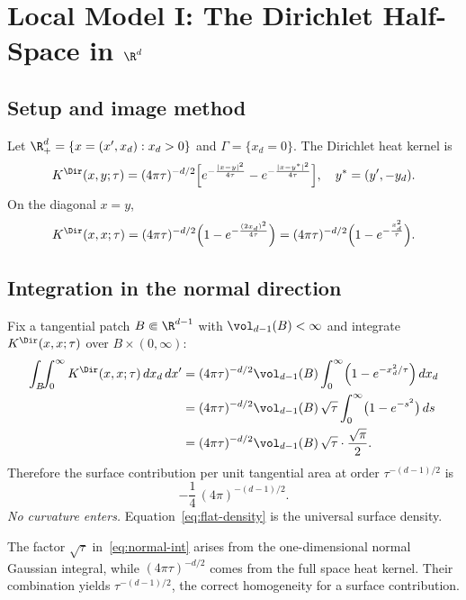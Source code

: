 \section{Local Model I: The Dirichlet Half-Space in $\R^d$}
\label{sec:model-halfspace}

\subsection{Setup and image method}
Let $\R^d_+=\{x=(x',x_d): x_d>0\}$ and $\Gamma=\{x_d=0\}$.
The Dirichlet heat kernel is
\begin{equation}\label{eq:dir-halfspace-kernel}
K^\Dir(x,y;\tau)=(4\pi\tau)^{-d/2}\Big[e^{-\frac{|x-y|^2}{4\tau}}-e^{-\frac{|x-y^\ast|^2}{4\tau}}\Big],
\quad y^\ast=(y',-y_d).
\end{equation}
On the diagonal $x=y$,
\begin{equation}\label{eq:diagonal-half}
K^\Dir(x,x;\tau)=(4\pi\tau)^{-d/2}\Big(1-e^{-\frac{(2x_d)^2}{4\tau}}\Big)=(4\pi\tau)^{-d/2}\Big(1-e^{-\frac{x_d^2}{\tau}}\Big).
\end{equation}

\subsection{Integration in the normal direction}
Fix a tangential patch $B\Subset\R^{d-1}$ with $\vol_{d-1}(B)<\infty$ and integrate $K^\Dir(x,x;\tau)$ over $B\times(0,\infty)$:
\begin{align}
\int_{B}\!\!\int_{0}^{\infty} K^\Dir(x,x;\tau)\,dx_d\,dx'
&=(4\pi\tau)^{-d/2}\vol_{d-1}(B)\int_0^\infty\!\Big(1-e^{-x_d^2/\tau}\Big)\,dx_d \nonumber\\
&=(4\pi\tau)^{-d/2}\vol_{d-1}(B)\,\sqrt{\tau}\int_0^\infty\!\big(1-e^{-s^2}\big)\,ds \nonumber\\
&=(4\pi\tau)^{-d/2}\vol_{d-1}(B)\,\sqrt{\tau}\cdot\frac{\sqrt{\pi}}{2}. \label{eq:normal-int}
\end{align}
Therefore the surface contribution per unit tangential area at order $\tau^{-(d-1)/2}$ is
\begin{equation}\label{eq:flat-density}
-\frac{1}{4}\,(4\pi)^{-(d-1)/2}.
\end{equation}
\emph{No curvature enters.} Equation~\eqref{eq:flat-density} is the universal surface density.

\begin{remark}
The factor $\sqrt{\tau}$ in~\eqref{eq:normal-int} arises from the one-dimensional normal Gaussian integral, while $(4\pi\tau)^{-d/2}$ comes from the full space heat kernel. Their combination yields $\tau^{-(d-1)/2}$, the correct homogeneity for a surface contribution.
\end{remark}

